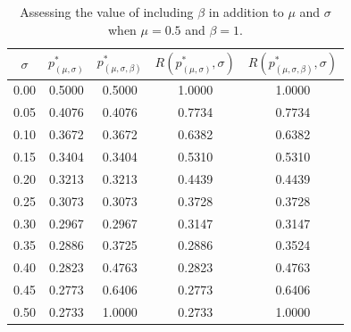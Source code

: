 \documentclass[11pt]{article}
\newcommand{\1}{\mathds{1}}
\begin{document}
\begin{table}[ht!]
\centering
\begin{tabular}{@{}ccccc@{}}
\toprule
$\sigma$ & $p^*_{(\mu,\sigma)}$ & $p^*_{(\mu,\sigma,\beta)}$ & $R(p^*_{(\mu,\sigma)},\sigma)$ & $R(p^*_{(\mu,\sigma,\beta)},\sigma)$ \\ \midrule
0.00 & 0.5000 & 0.5000 & 1.0000 & 1.0000 \\
0.05 & 0.4076 & 0.4076 & 0.7734 & 0.7734 \\
0.10 & 0.3672 & 0.3672 & 0.6382 & 0.6382 \\
0.15 & 0.3404 & 0.3404 & 0.5310 & 0.5310 \\
0.20 & 0.3213 & 0.3213 & 0.4439 & 0.4439 \\
0.25 & 0.3073 & 0.3073 & 0.3728 & 0.3728 \\
0.30 & 0.2967 & 0.2967 & 0.3147 & 0.3147 \\
0.35 & 0.2886 & 0.3725 & 0.2886 & 0.3524 \\
0.40 & 0.2823 & 0.4763 & 0.2823 & 0.4763 \\
0.45 & 0.2773 & 0.6406 & 0.2773 & 0.6406 \\
0.50 & 0.2733 & 1.0000 & 0.2733 & 1.0000 \\ \bottomrule
\end{tabular}
\caption{Assessing the value of including $\beta$ in addition to $\mu$ and $\sigma$ when $\mu = 0.5$ and $\beta = 1$.}\label{tabbb1}
\end{table}
\end{document}
